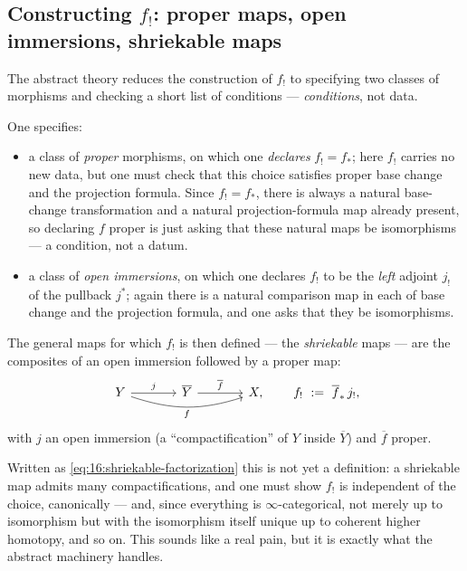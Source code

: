 \subsection{Constructing \texorpdfstring{$f_!$}{f\textunderscore!}: proper maps, open immersions, shriekable maps}
\label{subsec:16:constructing-fshriek}

The abstract theory reduces the construction of $f_!$ to specifying two classes of
morphisms and checking a short list of conditions --- \emph{conditions}, not data.

\begin{remark}
\label{rmk:16:fshriek-idea}
One specifies:
\begin{itemize}
\item a class of \emph{proper} morphisms, on which one \emph{declares} $f_!=f_*$; here
$f_!$ carries no new data, but one must check that this choice satisfies proper base
change and the projection formula. Since $f_!=f_*$, there is always a natural base-change
transformation and a natural projection-formula map already present, so declaring $f$
proper is just asking that these natural maps be isomorphisms --- a condition, not a datum.
\item a class of \emph{open immersions}, on which one declares $f_!$ to be the
\emph{left} adjoint $j_!$ of the pullback $j^*$; again there is a natural comparison
map in each of base change and the projection formula, and one asks that they be
isomorphisms.
\end{itemize}
The general maps for which $f_!$ is then defined --- the \emph{shriekable} maps --- are
the composites of an open immersion followed by a proper map:
\begin{equation}
\label{eq:16:shriekable-factorization}
\begin{tikzcd}[column sep=large]
Y \arrow[r, "j"] \arrow[rr, bend right=18, "f"'] & \overline Y \arrow[r, "\overline f"] & X,
\end{tikzcd}
\qquad f_!\ :=\ \overline f_*\, j_!,
\end{equation}
with $j$ an open immersion (a ``compactification'' of $Y$ inside $\overline Y$) and
$\overline f$ proper.
\end{remark}

\begin{remark}
\label{rmk:16:compactification-caveat}
Written as \eqref{eq:16:shriekable-factorization} this is not yet a definition: a
shriekable map admits many compactifications, and one must show $f_!$ is independent
of the choice, canonically --- and, since everything is $\infty$-categorical, not
merely up to isomorphism but with the isomorphism itself unique up to coherent higher
homotopy, and so on. This sounds like a real pain, but it is exactly what the abstract
machinery handles.
\end{remark}

